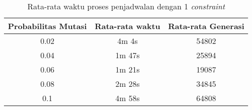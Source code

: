  \begin{longtable}[c]{|c|c|c|}
    \caption{Rata-rata waktu proses penjadwalan dengan 1 \textit{constraint}}
    \label{tab:1 constraint}\\
    \hline
    \rowcolor[HTML]{C0C0C0} 
    Probabilitas Mutasi & Rata-rata waktu & Rata-rata Generasi \\ \hline
    0.02                & 4m 4s           & 54802               \\ \hline
    0.04                & 1m 47s          & 25894               \\ \hline
    0.06                & 1m 21s          & 19087               \\ \hline
    0.08                & 2m 28s          & 34845               \\ \hline
    0.1                 & 4m 58s          & 64808               \\ \hline
    \end{longtable}
  

